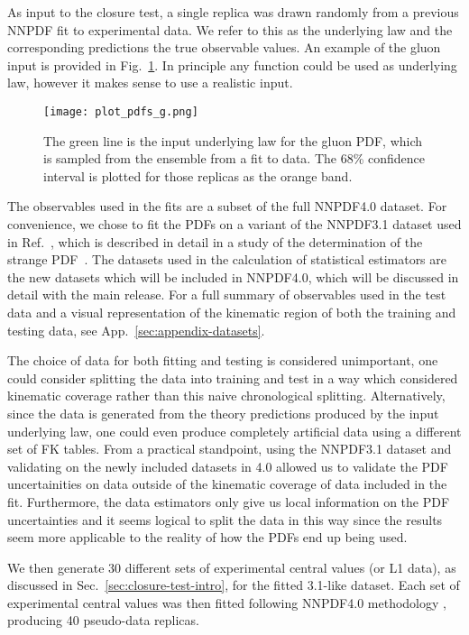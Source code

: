 As input to the closure test, a single replica was drawn randomly from a
previous NNPDF fit to experimental data. We refer to this as the underlying law
and the corresponding predictions the true observable values. An example of the
gluon input is provided in Fig.~\ref{fig:InputGluonPDF}. In principle any
function could be used as underlying law, however it makes sense to use a
realistic input.

\begin{figure}
    \centering
    \texttt{[image: plot\_pdfs\_g.png]}
    \caption{The green line is the input underlying law for the gluon PDF,
    which is sampled from the ensemble from a fit to data. The 68\% confidence
    interval is plotted for those replicas as the orange band.}
    \label{fig:InputGluonPDF}
\end{figure}

The observables used in the fits are a subset of the full NNPDF4.0 dataset. For
convenience, we chose to fit the PDFs on a variant of the NNPDF3.1 dataset used
in Ref.~\cite{Ball_2018}, which is described in detail in a study of the
determination of the strange PDF~\cite{Faura_2020}. The datasets used in the
calculation of statistical estimators are the new datasets which will be
included in NNPDF4.0, which will be discussed in detail with the main release.
For a full summary of observables used in the test data and a visual
representation of the kinematic region of both the training and testing data,
see App.~\ref{sec:appendix-datasets}.

The choice of data for both fitting and testing is considered unimportant, one
could consider splitting the data into training and test in a way which
considered kinematic coverage rather than this naive chronological splitting.
Alternatively, since the data is generated from the theory predictions produced
by the input underlying law, one could even produce completely artificial data
using a different set of FK tables. From a practical standpoint, using the
NNPDF3.1 dataset and validating on the newly included datasets in 4.0 allowed us
to validate the PDF uncertainities on data outside of the kinematic coverage of
data included in the fit. Furthermore, the data estimators only give us local
information on the PDF uncertainties and it seems logical to split the data in
this way since the results seem more applicable to the reality of how the PDFs
end up being used.

We then generate 30 different sets of experimental central values (or L1 data),
as discussed in Sec.~\ref{sec:closure-test-intro}, for the fitted 3.1-like
dataset. Each set of experimental central values was then fitted following
NNPDF4.0 methodology \cite{NNPDF40}, producing 40 pseudo-data replicas.

